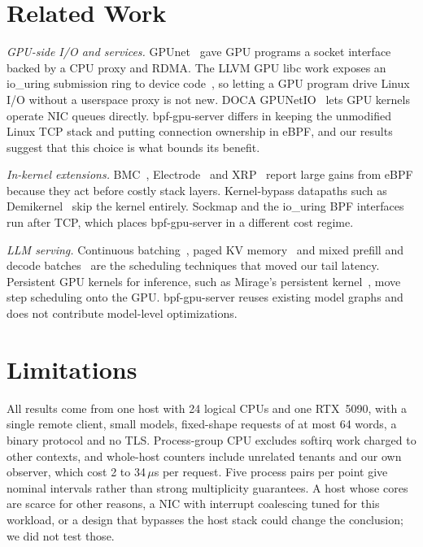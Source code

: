 \documentclass[sigconf,nonacm]{acmart}
\newcommand{\us}{\,$\mu$s}
\begin{document}
\section{Related Work}

\emph{GPU-side I/O and services.} GPUnet~\cite{gpunet} gave GPU programs a
socket interface backed by a CPU proxy and RDMA. The LLVM GPU libc work exposes
an io\_uring submission ring to device code~\cite{llvmgpuio}, so letting a GPU
program drive Linux I/O without a userspace proxy is not new. DOCA
GPUNetIO~\cite{gpunetio} lets GPU kernels operate NIC queues directly. bpf-gpu-server
differs in keeping the unmodified Linux TCP stack and putting connection
ownership in eBPF, and our results suggest that this choice is what bounds its
benefit.

\emph{In-kernel extensions.} BMC~\cite{bmc}, Electrode~\cite{electrode} and
XRP~\cite{xrp} report large gains from eBPF because they act before costly
stack layers. Kernel-bypass datapaths such as Demikernel~\cite{demikernel} skip
the kernel entirely. Sockmap and the io\_uring BPF interfaces~\cite{iouring}
run after TCP, which places bpf-gpu-server in a different cost regime.

\emph{LLM serving.} Continuous batching~\cite{orca}, paged KV
memory~\cite{vllm} and mixed prefill and decode batches~\cite{sarathi} are the
scheduling techniques that moved our tail latency. Persistent GPU kernels for
inference, such as Mirage's persistent kernel~\cite{mpk}, move step scheduling
onto the GPU. bpf-gpu-server reuses existing model graphs and does not contribute
model-level optimizations.

\section{Limitations}

All results come from one host with 24 logical CPUs and one RTX~5090, with a
single remote client, small models, fixed-shape requests of at most 64 words, a
binary protocol and no TLS. Process-group CPU excludes softirq work charged to
other contexts, and whole-host counters include unrelated tenants and our own
observer, which cost 2 to 34\us{} per request. Five process pairs per point
give nominal intervals rather than strong multiplicity guarantees. A host
whose cores are scarce for other reasons, a NIC with interrupt coalescing
tuned for this workload, or a design that bypasses the host stack could change
the conclusion; we did not test those.
\end{document}
